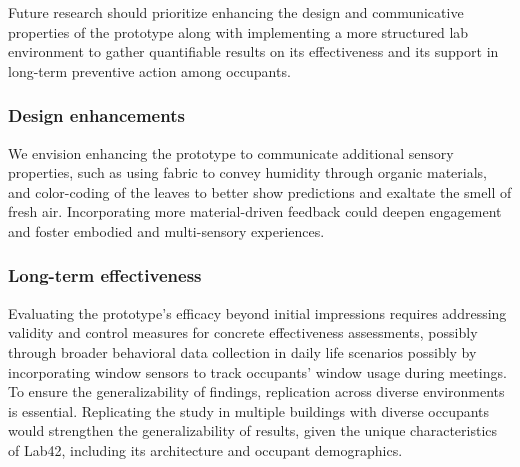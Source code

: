 Future research should prioritize enhancing the design and communicative properties of the prototype along with implementing a more structured lab environment to gather quantifiable results on its effectiveness and its support in long-term preventive action among occupants. 

\subsubsection{Design enhancements}
We envision enhancing the prototype to communicate additional sensory properties, such as using fabric to convey humidity through organic materials, and color-coding of the leaves to better show predictions and exaltate the smell of fresh air. Incorporating more material-driven feedback could deepen engagement and foster embodied and multi-sensory experiences. 

\subsubsection{Long-term effectiveness}
Evaluating the prototype's efficacy beyond initial impressions requires addressing validity and control measures for concrete effectiveness assessments, possibly through broader behavioral data collection in daily life scenarios possibly by incorporating window sensors to track occupants' window usage during meetings. To ensure the generalizability of findings, replication across diverse environments is essential. Replicating the study in multiple buildings with diverse occupants would strengthen the generalizability of results, given the unique characteristics of Lab42, including its architecture and occupant demographics.